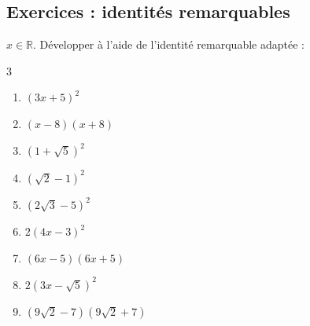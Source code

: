 
\newpage 
{}  
\pagestyle{scrheadings} %
\onehalfspacing
\subsection{Exercices : identités remarquables}




\begin{exercise} \label{chap02:exo:identite:niveau1}
	$x\in\mathbb{R}$. Développer à l'aide de l'identité remarquable adaptée :
	\begin{multicols}{3}
		\begin{enumerate}[label={$\Alph*=$},left= 0pt]
			\item $(3x+5)^2$  
			\item $(x-8)(x+8)$ 
			\item $(1+\sqrt{5})^2$
			\item $(\sqrt{2}-1)^2$
			\item $(2\sqrt{3}-5)^2$
			\item $2(4x-3)^2$  
			\item $(6x-5)(6x+5)$  
			\item $2(3x-\sqrt{5})^2$  
			\item $(9\sqrt{2}-7)(9\sqrt{2}+7)$
		\end{enumerate}
	\end{multicols}
\end{exercise}

